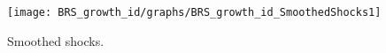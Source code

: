  
\begin{figure}[H]
\centering 
\texttt{[image: BRS\_growth\_id/graphs/BRS\_growth\_id\_SmoothedShocks1]}
\caption{Smoothed shocks.}\label{Fig:SmoothedShocks:1}
\end{figure}


